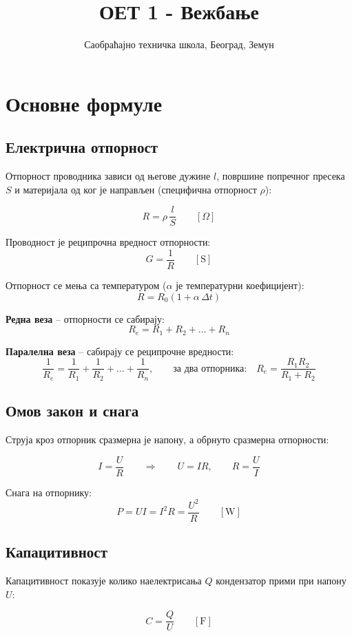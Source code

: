 \documentclass{article}
\title{ОЕТ 1 - Вежбање}
\author{Саобраћајно техничка школа, Београд, Земун}
\begin{document}
\section{Основне формуле}

\subsection{Електрична отпорност}

Отпорност проводника зависи од његове дужине $l$, површине попречног пресека $S$
и материјала од ког је направљен (специфична отпорност $\rho$):
\begin{kljucno}
\[
R = \rho \, \frac{l}{S} \qquad [\Omega]
\]
\end{kljucno}

Проводност је реципрочна вредност отпорности:
\[
G = \frac{1}{R} \qquad [\text{S}]
\]

Отпорност се мења са температуром ($\alpha$ је температурни коефицијент):
\[
R = R_0 \left(1 + \alpha \, \Delta t\right)
\]

\textbf{Редна веза} -- отпорности се сабирају:
\[
R_e = R_1 + R_2 + \dots + R_n
\]

\textbf{Паралелна веза} -- сабирају се реципрочне вредности:
\[
\frac{1}{R_e} = \frac{1}{R_1} + \frac{1}{R_2} + \dots + \frac{1}{R_n},
\qquad \text{за два отпорника:} \quad R_e = \frac{R_1 R_2}{R_1 + R_2}
\]

\subsection{Омов закон и снага}

Струја кроз отпорник сразмерна је напону, а обрнуто сразмерна отпорности:
\begin{kljucno}
\[
I = \frac{U}{R} \qquad \Longrightarrow \qquad U = I R, \qquad R = \frac{U}{I}
\]
\end{kljucno}

Снага на отпорнику:
\[
P = U I = I^2 R = \frac{U^2}{R} \qquad [\text{W}]
\]

\subsection{Капацитивност}

Капацитивност показује колико наелектрисања $Q$ кондензатор прими при напону $U$:
\begin{kljucno}
\[
C = \frac{Q}{U} \qquad [\text{F}]
\]
\end{kljucno}
\end{document}
